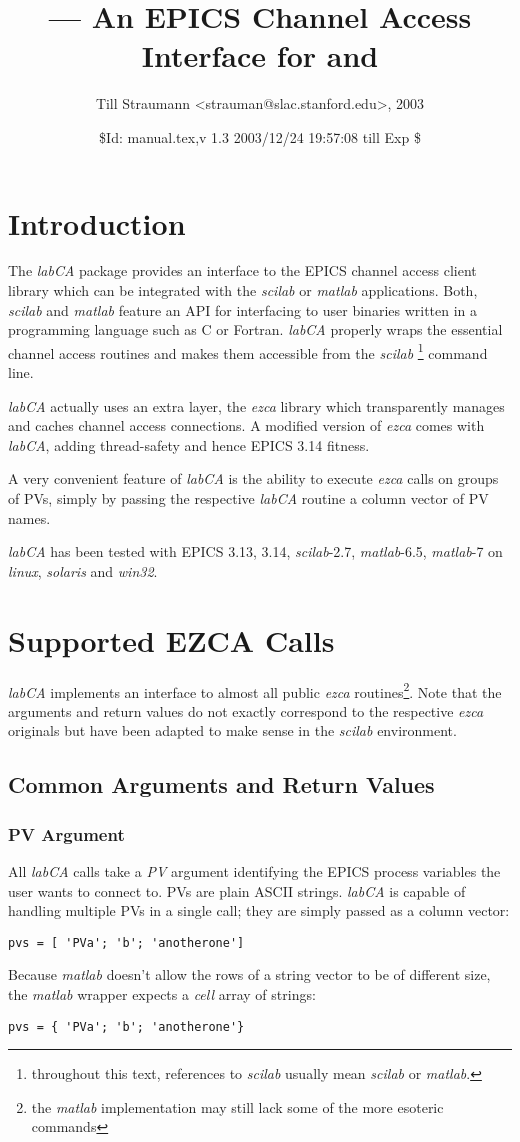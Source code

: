 \documentclass{article}
\title{\sca{} --- An EPICS Channel Access Interface for \scilab{} and \matlab{}}
\author{Till Straumann <strauman@slac.stanford.edu>, 2003}
\date{\$Id: manual.tex,v 1.3 2003/12/24 19:57:08 till Exp \$}
\newcommand{\sca}{{\em labCA}}
\newcommand{\scilab}{{\em scilab}}
\newcommand{\matlab}{{\em matlab}}
\newcommand{\windoze}{{\em win32}}
\newcommand{\ezca}{{\em ezca}}
\begin{document}
\maketitle
\section{Introduction}
The \sca{} package provides an interface to the
EPICS channel access client library which can be
integrated with the \scilab{} or \matlab{} applications.
Both, \scilab{} and \matlab{} feature an API for interfacing
to user binaries written in a programming language such
as C or Fortran. \sca{} properly wraps the essential
channel access routines and makes them accessible
from the \scilab%
\footnote{throughout this text, references to \scilab{}
usually mean \scilab{} or \matlab.}
command line.

\sca{} actually uses an extra layer, the \ezca{} library
which transparently manages and caches channel access 
connections. A modified version of \ezca{} comes with
\sca, adding thread-safety and hence EPICS 3.14 fitness.

A very convenient feature of \sca{} is the ability
to execute \ezca{} calls on groups of PVs, simply by
passing the respective \sca{} routine a column vector
of PV names.

\sca{} has been tested with EPICS 3.13, 3.14, \scilab-2.7,
\matlab-6.5, \matlab-7 on {\em linux}, {\em solaris} and
\windoze.

\section{Supported EZCA Calls}
\sca{} implements an interface to almost all public
\ezca{} routines\footnote{%
the \matlab{} implementation may still lack some of the
more esoteric commands}. Note that the arguments and
return values do not exactly correspond to the respective
\ezca{} originals but have been adapted to make sense
in the  \scilab{} environment.

\subsection{Common Arguments and Return Values}
\subsubsection{PV Argument}
All \sca{} calls take a {\em PV} argument identifying
the EPICS process variables the user wants to connect to.
PVs are plain ASCII strings. \sca{} is capable of handling
multiple PVs in a single call; they are simply passed as a
column vector:
\begin{verbatim}
pvs = [ 'PVa'; 'b'; 'anotherone']
\end{verbatim}
Because \matlab{} doesn't allow the rows of
a string vector to be of different size, the \matlab{}
wrapper expects a {\em cell} array of strings:
\begin{verbatim}
pvs = { 'PVa'; 'b'; 'anotherone'}
\end{verbatim}
\end{document}
